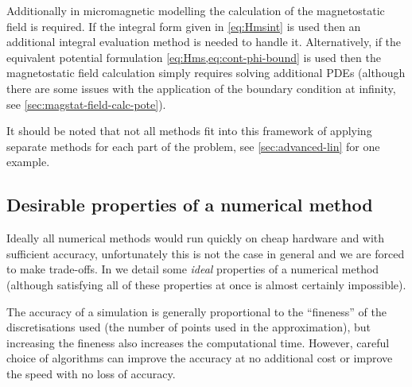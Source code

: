 Additionally in micromagnetic modelling the calculation of the magnetostatic field is required.
If the integral form given in \cref{eq:Hmsint} is used then an additional integral evaluation method is needed to handle it.
Alternatively, if the equivalent potential formulation \cref{eq:Hms,eq:cont-phi-bound} is used then the magnetostatic field calculation simply requires solving additional PDEs (although there are some issues with the application of the boundary condition at infinity, see \cref{sec:magstat-field-calc-pote}).

It should be noted that not all methods fit into this framework of applying separate methods for each part of the problem, see \cref{sec:advanced-lin} for one example.



\subsection{Desirable properties of a numerical method}

Ideally all numerical methods would run quickly on cheap hardware and with sufficient accuracy, unfortunately this is not the case in general and we are forced to make trade-offs.
In  we detail some \emph{ideal} properties of a numerical method (although satisfying all of these properties at once is almost certainly impossible).

The accuracy of a simulation is generally proportional to the ``fineness''  of the discretisations used (\ie the number of points used in the approximation), but increasing the fineness also increases the computational time.
However, careful choice of algorithms can improve the accuracy at no additional cost or improve the speed with no loss of accuracy.

